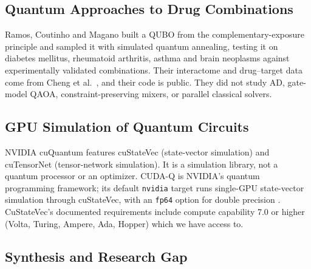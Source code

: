 \subsection{Quantum Approaches to Drug Combinations}

Ramos, Coutinho and Magano \cite{ramos2025quantum} built a QUBO from the complementary-exposure principle and sampled it with simulated quantum annealing, testing it on diabetes mellitus, rheumatoid arthritis, asthma and brain neoplasms against experimentally validated combinations. Their interactome and drug--target data come from Cheng et al.\ \cite{cheng2019combinations}, and their code is public. They did not study AD, gate-model QAOA, constraint-preserving mixers, or parallel classical solvers.

\subsection{GPU Simulation of Quantum Circuits}

NVIDIA cuQuantum \cite{bayraktar2023cuquantum} features cuStateVec (state-vector simulation) and cuTensorNet (tensor-network simulation). It is a simulation library, not a quantum processor or an optimizer. CUDA-Q \cite{cudaq_docs} is NVIDIA's quantum programming framework; its default \texttt{nvidia} target runs single-GPU state-vector simulation through cuStateVec, with an \texttt{fp64} option for double precision \cite{cudaq_docs}. CuStateVec's documented requirements include compute capability 7.0 or higher (Volta, Turing, Ampere, Ada, Hopper) \cite{cuquantum_docs} which we have access to.

\subsection{Synthesis and Research Gap}

